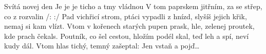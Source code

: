 \begin{TEXT}{Svítá novej den}
\SLOKA* {}  
\SLOKA Je  je  \NL
je  ticho a tmy vládnou \NL
V tom paprskem jitřním, \NL
za se střep, co z rozvalin \NL
\REFREN  /:   :/
\SLOKA Pad vichřicí strom, ptáci vypadli z hnízd,\NL
slyšíš jejich křik, nemaj si kam vlízt.\NL
Vtom v kořenech starých pupen prask,\NL
hle, zelenej proutek, kde prach čekals.
\REFRENHRAJ
\SLOKA Poutník, co šel cestou, hložím podél skal,\NL
teď leh a spí, neví kudy dál.\NL
Vtom hlas tichý, temný zašeptal:\NL
Jen vstaň a pojď…
\REFRENHRAJ
\end{TEXT}
